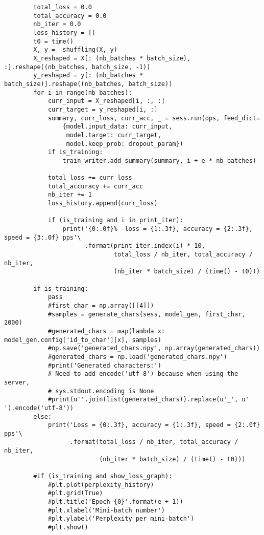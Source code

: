 \begin{lstlisting}
        total_loss = 0.0
        total_accuracy = 0.0
        nb_iter = 0.0
        loss_history = []
        t0 = time()
        X, y = _shuffling(X, y)
        X_reshaped = X[: (nb_batches * batch_size), :].reshape((nb_batches, batch_size, -1))
        y_reshaped = y[: (nb_batches * batch_size)].reshape((nb_batches, batch_size))
        for i in range(nb_batches):
            curr_input = X_reshaped[i, :, :]
            curr_target = y_reshaped[i, :]
            summary, curr_loss, curr_acc, _ = sess.run(ops, feed_dict=
                {model.input_data: curr_input, 
                 model.target: curr_target,
                 model.keep_prob: dropout_param})
            if is_training:
                train_writer.add_summary(summary, i + e * nb_batches)

            total_loss += curr_loss
            total_accuracy += curr_acc
            nb_iter += 1
            loss_history.append(curr_loss)

            if (is_training and i in print_iter):
                print('{0:.0f}%  loss = {1:.3f}, accuracy = {2:.3f}, speed = {3:.0f} pps'\
                      .format(print_iter.index(i) * 10, 
                              total_loss / nb_iter, total_accuracy / nb_iter,
                              (nb_iter * batch_size) / (time() - t0)))
                
        if is_training:
            pass
            #first_char = np.array([[4]])
            #samples = generate_chars(sess, model_gen, first_char, 2000)
            #generated_chars = map(lambda x: model_gen.config['id_to_char'][x], samples)
            #np.save('generated_chars.npy', np.array(generated_chars))
            #generated_chars = np.load('generated_chars.npy')
            #print('Generated characters:')
            # Need to add encode('utf-8') because when using the server,
            # sys.stdout.encoding is None
            #print(u''.join(list(generated_chars)).replace(u'_', u' ').encode('utf-8'))
        else:
            print('Loss = {0:.3f}, accuracy = {1:.3f}, speed = {2:.0f} pps'\
                  .format(total_loss / nb_iter, total_accuracy / nb_iter,
                          (nb_iter * batch_size) / (time() - t0)))

        #if (is_training and show_loss_graph):
            #plt.plot(perplexity_history)
            #plt.grid(True)
            #plt.title('Epoch {0}'.format(e + 1))
            #plt.xlabel('Mini-batch number')
            #plt.ylabel('Perplexity per mini-batch')
            #plt.show()
            

\end{lstlisting}
